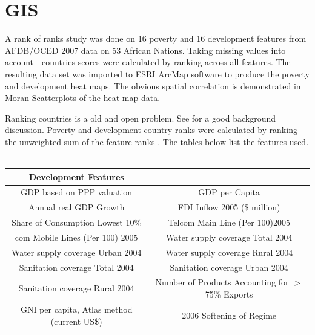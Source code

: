 \chapter{GIS}
A rank of ranks study was done on 16 poverty and 16 development
features from AFDB/OCED 2007 data on 53 African Nations.  Taking
missing values into account - countries scores were calculated by
ranking across all features.  The resulting data set was imported
to ESRI ArcMap software to produce the poverty and development
heat maps.  The obvious spatial correlation is demonstrated in
Moran Scatterplots of the heat map data.

Ranking countries is a old and open problem.  See  for a good background discussion.  Poverty and
development country ranks were calculated by ranking the
unweighted sum of the feature ranks . The tables below list the
features used.\\\\

\begin{tabular}{|c c|}
  \hline
  Development Features & \\
  \hline
GDP based on PPP valuation &     GDP per Capita   \\
  Annual real GDP Growth & FDI Inflow 2005 (\$ million) \\
Share of Consumption Lowest 10\%  &   Telcom Main Line (Per
100)2005 \\  com Mobile Lines (Per 100) 2005 & Water supply coverage Total  2004 \\
Water supply coverage Urban 2004 & Water supply coverage Rural
2004 \\ Sanitation coverage Total  2004 &   Sanitation coverage Urban 2004 \\
 Sanitation coverage Rural 2004 & Number of Products Accounting for $>$ 75\%
 Exports
 \\ GNI per capita, Atlas method (current US\$) &  2006 Softening of
 Regime \\
\hline
\end{tabular}
\\\\\\

